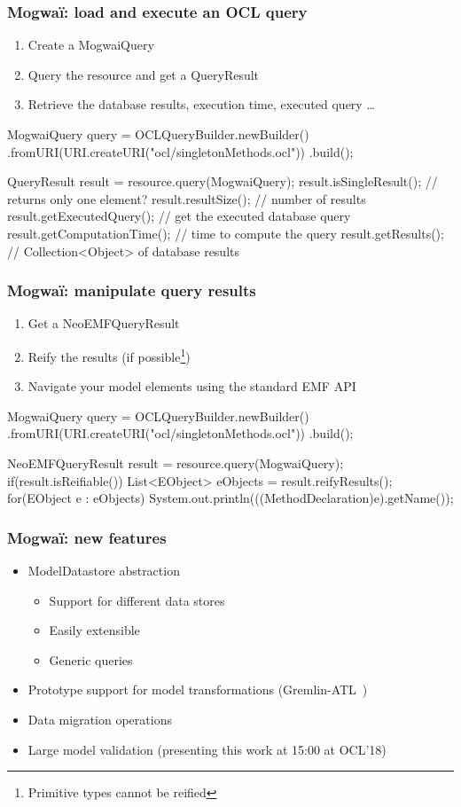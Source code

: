 \begin{frame}[fragile]\frametitle{Mogwa\"i: load and execute an OCL query}
\begin{enumerate}
\item Create a MogwaiQuery
\item Query the resource and get a QueryResult
\item Retrieve the database results, execution time, executed query \ldots
\end{enumerate}
\begin{java}
MogwaiQuery query = OCLQueryBuilder.newBuilder()
	.fromURI(URI.createURI("ocl/singletonMethods.ocl"))
	.build();
	
QueryResult result = resource.query(MogwaiQuery);
result.isSingleResult(); // returns only one element?
result.resultSize(); // number of results
result.getExecutedQuery(); // get the executed database query
result.getComputationTime(); // time to compute the query
result.getResults(); // Collection<Object> of database results
\end{java}
\end{frame}

\begin{frame}[fragile]\frametitle{Mogwa\"i: manipulate query results}
\begin{enumerate}
\item Get a NeoEMFQueryResult
\item Reify the results (if possible\footnote{Primitive types cannot be reified})
\item Navigate your model elements using the standard EMF API
\end{enumerate}
\begin{java}
MogwaiQuery query = OCLQueryBuilder.newBuilder()
	.fromURI(URI.createURI("ocl/singletonMethods.ocl"))
	.build();
	
NeoEMFQueryResult result = resource.query(MogwaiQuery);
if(result.isReifiable()) {
	List<EObject> eObjects = result.reifyResults();
	for(EObject e : eObjects) {
		System.out.println(((MethodDeclaration)e).getName());
	}
}
\end{java}
\end{frame}

\begin{frame}[c]\frametitle{Mogwa\"i: new features}
\begin{itemize}
	\item ModelDatastore abstraction
		\begin{itemize}
		\item Support for different data stores
		\item Easily extensible
		\item Generic queries
		\end{itemize}
	\item Prototype support for model transformations (Gremlin-ATL~\cite{daniel2017gremlin})
	\item Data migration operations
	\item Large model validation (presenting this work at 15:00 at OCL'18)
\end{itemize}

\end{frame}

